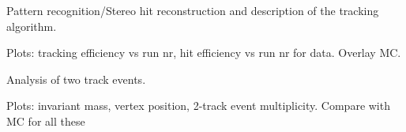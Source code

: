 \vspace{1cm}{\bf Tracking algorithms [Matt/Omar]}


Pattern recognition/Stereo hit reconstruction and description of the tracking algorithm. 

Plots: tracking efficiency vs run nr, hit efficiency vs run nr for data. Overlay MC.

\vspace{1cm}{\bf Tracking algorithms [Matt]}


Analysis of two track events. 

Plots: invariant mass, vertex position, 2-track event multiplicity. Compare with MC for all these 
